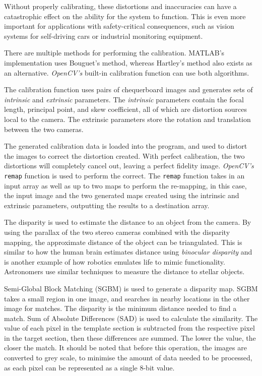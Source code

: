 \documentclass[conference]{IEEEtran}
\begin{document}
Without properly calibrating, these distortions and inaccuracies can have a catastrophic effect on the ability for the system to function. This is even more important for applications with safety-critical consequences, such as vision systems for self-driving cars\cite{Bosch} or industrial monitoring equipment\cite{Intel}.

There are multiple methods for performing the calibration. MATLAB's implementation uses Bouguet's method\cite{MATLAB_Calibration}\cite{Bouguet}, whereas Hartley's method\cite{hartley2003multiple} also exists as an alternative. \textit{OpenCV's} built-in calibration function can use both algorithms\cite{Book_Calibration}.

The calibration function uses pairs of chequerboard images and generates sets of \textit{intrinsic} and \textit{extrinsic} parameters. The \textit{intrinsic} parameters contain the focal length, principal point, and skew coefficient, all of which are distortion sources local to the camera. The extrinsic parameters store the rotation and translation between the two cameras. 

The generated calibration data is loaded into the program, and used to distort the images to correct the distortion created. With perfect calibration, the two distortions will completely cancel out, leaving a perfect fidelity image. \textit{OpenCV's} \verb|remap|\cite{remap} function is used to perform the correct. The \verb|remap| function takes in an input array as well as up to two maps to perform the re-mapping, in this case, the input image and the two generated maps created using the intrinsic and extrinsic parameters, outputting the results to a destination array\cite{remap_docs}.

The disparity is used to estimate the distance to an object from the camera. By using the parallax of the two stereo cameras combined with the disparity mapping, the approximate distance of the object can be triangulated. This is similar to how the human brain estimates distance using \textit{binocular disparity}\cite{10.3389/fpsyg.2014.00870}\cite{BERRYHILL2012525} and is another example of how robotics emulates life to mimic functionality. Astronomers use similar techniques to measure the distance to stellar objects\cite{parallax}.

Semi-Global Block Matching (SGBM) is used to generate a disparity map. SGBM takes a small region in one image, and searches in nearby locations in the other image for matches. The disparity is the minimum distance needed to find a match. Sum of Absolute Differences (SAD) is used to calculate the similarity\cite{StereoBlockMatching}. The value of each pixel in the template section is subtracted from the respective pixel in the target section, then these differences are summed. The lower the value, the closer the match. It should be noted that before this operation, the images are converted to grey scale, to minimise the amount of data needed to be processed, as each pixel can be represented as a single 8-bit value.
\end{document}
